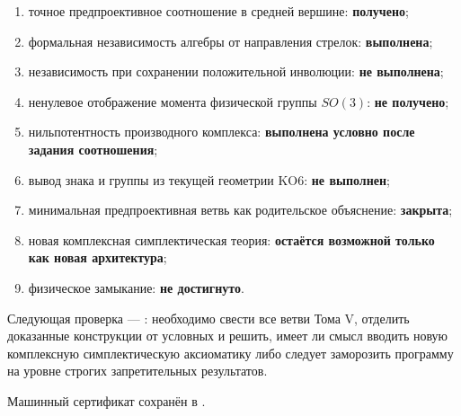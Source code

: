 \begin{protocol}
\begin{enumerate}
 \item точное предпроективное соотношение в средней вершине:
 \textbf{получено};
 \item формальная независимость алгебры от направления стрелок:
 \textbf{выполнена};
 \item независимость при сохранении положительной инволюции:
 \textbf{не выполнена};
 \item ненулевое отображение момента физической группы \(SO(3)\):
 \textbf{не получено};
 \item нильпотентность производного комплекса:
 \textbf{выполнена условно после задания соотношения};
 \item вывод знака и группы из текущей геометрии KO6:
 \textbf{не выполнен};
 \item минимальная предпроективная ветвь как родительское объяснение:
 \textbf{закрыта};
 \item новая комплексная симплектическая теория:
 \textbf{остаётся возможной только как новая архитектура};
 \item физическое замыкание: \textbf{не достигнуто}.
\end{enumerate}
\end{protocol}

Следующая проверка ---
: необходимо свести
все ветви Тома V, отделить доказанные конструкции от условных и решить,
имеет ли смысл вводить новую комплексную симплектическую аксиоматику либо
следует заморозить программу на уровне строгих запретительных результатов.

Машинный сертификат сохранён в
.
